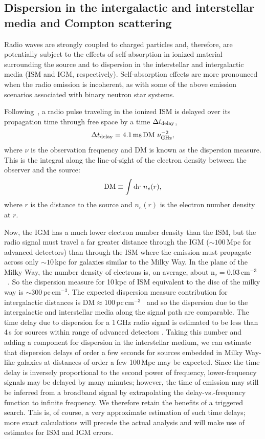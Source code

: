 \subsection{Dispersion in the intergalactic and interstellar media and Compton scattering}
Radio waves are strongly coupled to charged
particles and, therefore, are potentially subject to the effects of 
self-absorption in ionized material surrounding the source and to dispersion 
in the interstellar and intergalactic media (ISM and IGM, respectively). 
Self-absorption effects are more pronounced when the radio emission 
is incoherent, as with some of the above emission scenarios associated with
binary neutron star systems.

Following~\cite{pulsar_book}, a radio pulse traveling
in the ionized ISM is delayed over its propagation time through 
free space by a time $\Delta t_{\rm delay}$,
\begin{equation}
\Delta t_{\rm delay} = 4.1\,{\rm ms}\,{\rm DM}~\nu^{-2}_{\rm GHz},
\end{equation}
where $\nu$ is the observation frequency and DM is known as the dispersion measure.
This is the integral along the 
line-of-sight of the electron density between the observer and the source:
\begin{equation}
{\rm DM} \equiv \int {\rm d}r~n_e(r),
\end{equation}
where $r$ is the distance to the source and $n_e(r)$ is the electron number
density at $r$.

Now, the IGM has a much lower electron number density than the ISM, but the
radio signal must travel a far greater distance through the IGM ($\sim 100$\,Mpc
for advanced detectors) than through the ISM where the emission must propagate across
only $\sim 10$\,kpc for galaxies similar to the Milky Way. In the plane of
the Milky Way, the number density of electrons is, on average, about
$\mathrm{n_e=0.03\,cm^{-3}}$~\cite{thompson}.  So the dispersion
measure for 10\,kpc of ISM equivalent to the disc of
the milky way is $\mathrm{\sim 300\,pc\,cm^{-3}}$.  The expected dispersion
measure contribution for intergalactic distances is $\mathrm{DM} \approx 
100$\,pc\,cm$^{-3}$~\cite{skadoc,palmer} and so the dispersion due to the intergalactic and
interstellar media along the signal path are comparable.  The time
delay due to dispersion for a 1\,GHz radio signal is estimated to be
less than 4\,s for sources within range of advanced detectors \cite{laz}.
Taking this number and adding a component for dispersion in the
interstellar medium, we can estimate that dispersion delays of order
a few seconds for sources embedded in Milky Way-like galaxies at
distances of order a few 100\,Mpc may be expected.
Since the time delay is inversely proportional to the second power of frequency,
lower-frequency signals may be delayed by many minutes; however, the
time of emission may still be inferred from a broadband signal by
extrapolating the delay-vs.-frequency function to infinite frequency.
We therefore retain the benefits of a triggered search. This is, of course, a very approximate estimation of such time delays; more exact calculations will precede the actual analysis and will make use of estimates for ISM and IGM errors.

